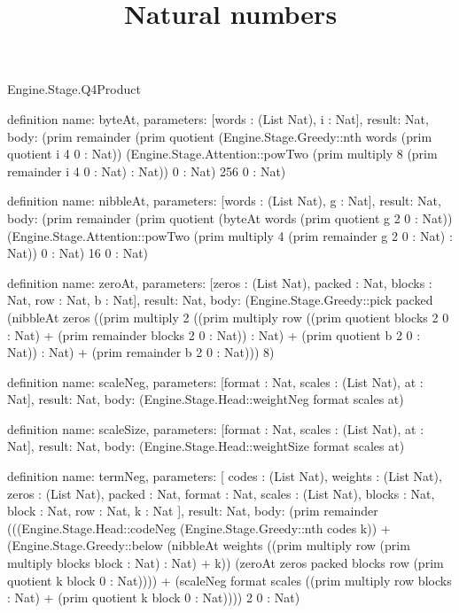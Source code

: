 \begin{lexlean}{Engine.Stage.Q4Product}
\title{Natural numbers}
\begin{semanticmodule}
definition{
  name: byteAt,
  parameters: [words : (List Nat), i : Nat],
  result: Nat,
  body: (prim remainder (prim quotient (Engine.Stage.Greedy::nth words (prim quotient i 4 0 : Nat)) (Engine.Stage.Attention::powTwo (prim multiply 8 (prim remainder i 4 0 : Nat) : Nat)) 0 : Nat) 256 0 : Nat)
}

definition{
  name: nibbleAt,
  parameters: [words : (List Nat), g : Nat],
  result: Nat,
  body: (prim remainder (prim quotient (byteAt words (prim quotient g 2 0 : Nat)) (Engine.Stage.Attention::powTwo (prim multiply 4 (prim remainder g 2 0 : Nat) : Nat)) 0 : Nat) 16 0 : Nat)
}

definition{
  name: zeroAt,
  parameters: [zeros : (List Nat), packed : Nat, blocks : Nat, row : Nat, b : Nat],
  result: Nat,
  body: (Engine.Stage.Greedy::pick packed (nibbleAt zeros ((prim multiply 2 ((prim multiply row ((prim quotient blocks 2 0 : Nat) + (prim remainder blocks 2 0 : Nat)) : Nat) + (prim quotient b 2 0 : Nat)) : Nat) + (prim remainder b 2 0 : Nat))) 8)
}

definition{
  name: scaleNeg,
  parameters: [format : Nat, scales : (List Nat), at : Nat],
  result: Nat,
  body: (Engine.Stage.Head::weightNeg format scales at)
}

definition{
  name: scaleSize,
  parameters: [format : Nat, scales : (List Nat), at : Nat],
  result: Nat,
  body: (Engine.Stage.Head::weightSize format scales at)
}

definition{
  name: termNeg,
  parameters: [
    codes : (List Nat),
    weights : (List Nat),
    zeros : (List Nat),
    packed : Nat,
    format : Nat,
    scales : (List Nat),
    blocks : Nat,
    block : Nat,
    row : Nat,
    k : Nat
  ],
  result: Nat,
  body: (prim remainder (((Engine.Stage.Head::codeNeg (Engine.Stage.Greedy::nth codes k)) + (Engine.Stage.Greedy::below (nibbleAt weights ((prim multiply row (prim multiply blocks block : Nat) : Nat) + k)) (zeroAt zeros packed blocks row (prim quotient k block 0 : Nat)))) + (scaleNeg format scales ((prim multiply row blocks : Nat) + (prim quotient k block 0 : Nat)))) 2 0 : Nat)
}


\end{semanticmodule}
\end{lexlean}
